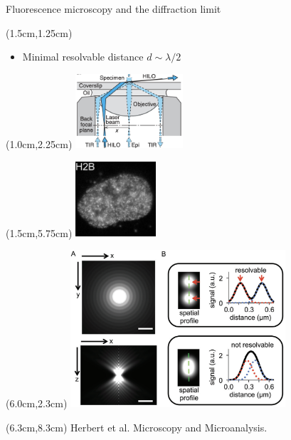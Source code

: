 \documentclass{beamer}					%
\begin{document}
\begin{frame}{Fluorescence microscopy and the diffraction limit}

\begin{textblock*}{10cm}(1.5cm,1.25cm)
\begin{itemize}
\item Minimal resolvable distance $d \sim \lambda/2$
\end{itemize}
\end{textblock*}

\begin{textblock*}{4cm}(1.0cm,2.25cm)
\includegraphics[width=4cm]{../../dissertation/dissertation/media/HILO}
\end{textblock*}

\begin{textblock*}{3cm}(1.5cm,5.75cm)
\includegraphics[width=3cm]{../../dissertation/dissertation/media/Widefield}
\end{textblock*}


\begin{textblock*}{8cm}(6.0cm,2.3cm)
\includegraphics[width=8cm]{../../dissertation/dissertation/media/PSF}
\end{textblock*}

\begin{textblock*}{8cm}(6.3cm,8.3cm)
Herbert et al. Microscopy and Microanalysis.
\end{textblock*}


\end{frame}
\end{document}
